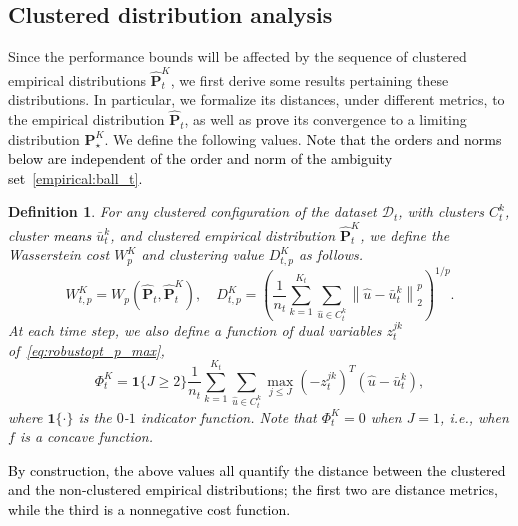 \documentclass[12pt]{article}
\newcommand{\ie}{{\it i.e.}}
\newcommand{\ones}{\mathbf 1}
\newcommand{\prob}{{\mathbf P}}
\newcommand{\unc}{u}
\newcommand{\barp}{p}
\newcommand{\ld}{W}
\newtheorem{definition}{Definition}[section]
\newcommand{\RC}[1]{\textcolor{black}{#1}}
\newcommand{\RC}[1]{\textcolor{blue}{#1}}
\begin{document}
\subsection{Clustered distribution analysis}
\label{sec:cluster_prop}
Since the performance bounds will be affected by the sequence of clustered empirical distributions $\hat{\prob}^K_t$, we first derive some results pertaining these distributions. 
In particular, we formalize its distances, under different metrics, to the empirical distribution $\hat{\prob}_t$, as well as \RC{prove} its convergence to a limiting distribution $\prob^K_\star$.
We define the following values. \RC{Note that the orders and norms below are independent of the order and norm of the ambiguity set~\eqref{empirical:ball_t}.}
\begin{definition}
\label{def:cluster_value}
    For any clustered configuration of the dataset $\mathcal{D}_t$, with clusters $C^k_t$, cluster \RC{means} $\bar{u}^k_t$, and clustered empirical distribution $\hat{\prob}^K_t$, we define the Wasserstein cost $\ld^K_{\barp} $ and clustering value $D^K_{t,\barp} $ as follows. 
    \begin{equation*}
        \ld^K_{t,\barp}= W_{\barp}(\hat{\prob}_t,\hat{\prob}^K_t), \quad D^K_{t,\barp} = \left(\frac{1}{n_t}\sum_{k=1}^{K_t}\sum_{\hat{\unc} \in C^k_t}\left\| \hat{\unc} - \bar{u}^k_t\right\|_2^{\barp}\right)^{1/{\barp}}.
         \end{equation*}
    At each time step, we also define a function of dual variables $z^{jk}_t$ of~\eqref{eq:robustopt_p_max}, 
    \begin{equation*}\Phi^K_t = \ones\{J\geq2\}\frac{1}{n_t}\sum_{k=1}^{K_t}\sum_{\hat{\unc} \in C^k_t}\max_{j\leq J} (-z_t^{{jk}})^T(\hat{\unc} - \bar{\unc}^k_t), \end{equation*}
   where $\ones\{\cdot\}$ is the $0$-$1$ indicator function. Note that $\Phi^K_t = 0$ when $J=1$, \ie, when $f$ is a concave function. 
\end{definition}
\RC{By construction, the above values all quantify the distance between the clustered and the non-clustered empirical distributions; the first two are distance metrics, while the third is a nonnegative cost function.}
\end{document}
